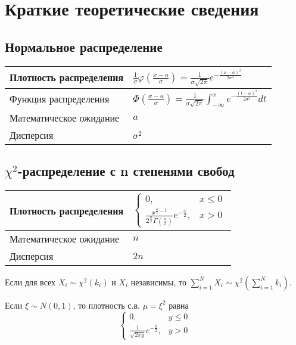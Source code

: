 \section{Краткие теоретические сведения}
\label{cha:theory}
\subsection{Нормальное распределение}

\begin{table}[ht]
    \centering
    \begin{tabular}{|l|l|}
    \hline
    Плотность распределения& $\frac{1}{\sigma}\varphi(\frac{x-a}{\sigma}) = \frac{1}{\sigma\sqrt{2\pi}}e^{-\frac{(x-a)^2}{2\sigma^2}}$\\
    \hline
    Функция распределения& $\Phi(\frac{x-a}{\sigma}) = \frac{1}{\sigma\sqrt{2\pi}} \int_{-\infty}^{x}e^{-\frac{(t-a)^2}{2\sigma^2}}dt$\\
    \hline
    Математическое ожидание&  $a$\\
    \hline
    Дисперсия&  $\sigma^2$\\
    \hline
    \end{tabular}
\end{table}

\subsection{$\chi^2$-распределение с n степенями свобод}

\begin{table}[ht]
    \centering
    \begin{tabular}{|l|l|}
    \hline
    Плотность распределения& $\begin{cases}0,& x\leq 0\\ \displaystyle\frac{x^{\frac{n}{2}-1}}{2^{\frac{n}{2}}\Gamma\left(\frac{n}{2}\right)}e^{-\frac{x}{2}},& x > 0\end{cases}$\\
    \hline
    Математическое ожидание& $n$ \\
    \hline
    Дисперсия& $2n$\\
    \hline
    \end{tabular}
\end{table}

Если для всех $X_i \sim \chi^2(k_i)$ и $X_i$ независимы, то $\sum\limits_{i=1}^N X_i \sim \chi^2\left(\sum\limits_{i=1}^N k_i\right)$.

Если $\xi \sim N(0,1)$, то плотность с.в. $\mu = \xi^2$ равна
$$
\begin{cases}
0,& y\leq0\\
\frac{1}{\sqrt{2\pi y}}e^{-\frac{y}{2}},& y > 0
\end{cases}
$$

